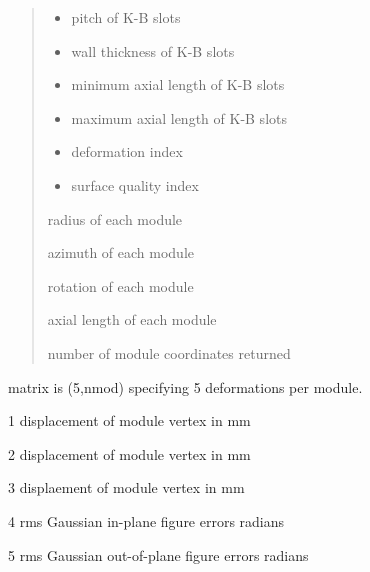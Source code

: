 \documentclass[letterpaper,10pt,english]{sphinxmanual}
\begin{document}
\begin{fulllineitems}
\begin{quote}
\begin{description}
\begin{itemize}
\item {} 
 \textendash{} pitch of K-B slots

\item {} 
 \textendash{} wall thickness of K-B slots

\item {} 
 \textendash{} minimum axial length of K-B slots

\item {} 
 \textendash{} maximum axial length of K-B slots

\item {} 
 \textendash{} deformation index

\item {} 
 \textendash{} surface quality index

\end{itemize}

\item[{Returns}] \leavevmode

\begin{DUlineblock}{0em}
\item[]         radius of each module
\item[]         azimuth of each module
\item[]         rotation of each module
\item[]         axial length of each module
\item[]       number of module coordinates returned
\end{DUlineblock}


\end{description}\end{quote}
\begin{description}
\item[{Deformation:}] \leavevmode
\begin{DUlineblock}{0em}
\item[] matrix is (5,nmod) specifying 5 deformations per module.
\item[]
\begin{DUlineblock}{\DUlineblockindent}
\item[] 1 displacement of module vertex in  mm
\item[] 2 displacement of module vertex in  mm
\item[] 3 displaement of module vertex in  mm
\item[] 4 rms Gaussian in-plane figure errors radians
\item[] 5 rms Gaussian out-of-plane figure errors radians
\end{DUlineblock}
\end{DUlineblock}


\end{description}
\end{fulllineitems}
\end{document}
